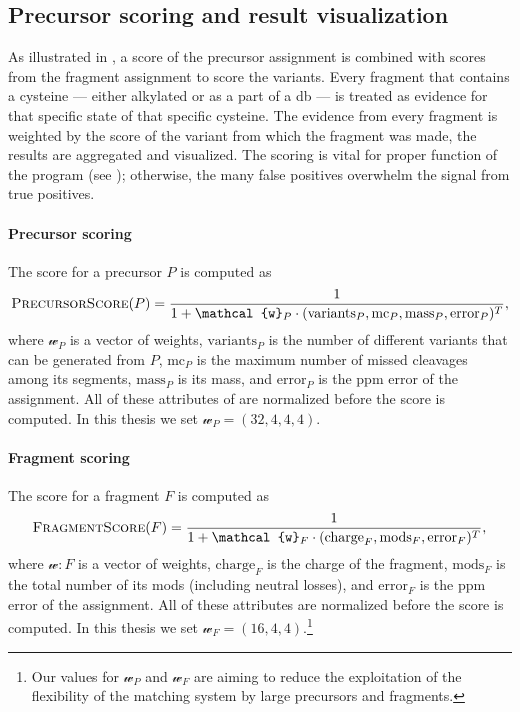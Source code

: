 \subsection{Precursor scoring and result visualization}\label{sec:scoring}

As illustrated in , a score of the precursor assignment is combined with scores from the fragment assignment to score the variants. Every fragment that contains a cysteine --- either alkylated or as a part of a \gls*{db} --- is treated as evidence for that specific state of that specific cysteine. The evidence from every fragment is weighted by the score of the variant from which the fragment was made, the results are aggregated and visualized. The scoring is vital for proper function of the program (see ); otherwise, the many false positives overwhelm the signal from true positives.

\paragraph{Precursor scoring} The score for a precursor \(P\) is computed as \[\textsc{PrecursorScore}(P) = \frac{1}{1 + \mathcal{w}_P \cdot (\mathrm{variants}_P, \mathrm{mc}_P, \mathrm{mass}_P, \mathrm{error}_P)^T},\] where \(\mathcal{w}_P\) is a vector of weights, \(\mathrm{variants}_P\) is the number of different variants that can be generated from \(P\), \(\mathrm{mc}_P\) is the maximum number of missed cleavages among its segments, \(\mathrm{mass}_P\) is its mass, and \(\mathrm{error}_P\) is the ppm error of the assignment. All of these attributes of are normalized before the score is computed. In this thesis we set \(\mathcal{w}_P = (32, 4, 4, 4)\).

\paragraph{Fragment scoring} The score for a fragment \(F\) is computed as \[\textsc{FragmentScore}(F) = \frac{1}{1 + \mathcal{w}_F \cdot (\mathrm{charge}_{F}, \mathrm{mods}_F, \mathrm{error}_F)^T},\] where \(\mathcal{w}:F\) is a vector of weights, \(\mathrm{charge}_F\) is the charge of the fragment, \(\mathrm{mods}_F\) is the total number of its mods (including neutral losses), and \(\mathrm{error}_F\) is the ppm error of the assignment. All of these attributes are normalized before the score is computed. In this thesis we set \(\mathcal{w}_F = (16, 4, 4)\).\footnote{Our values for \(\mathcal{w}_P\) and \(\mathcal{w}_F\) are aiming to reduce the exploitation of the flexibility of the matching system by large precursors and fragments.}

